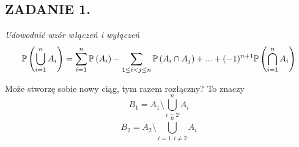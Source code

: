 \documentclass{article}
\begin{document}
\subsection*{ZADANIE 1.}
\emph{Udowodnić wzór włączeń i wyłączeń}
$$\mathbb{P}\left(\bigcup\limits_{i=1}^nA_i\right)=\sum\limits_{i=1}^n\mathbb{P}\left(A_i\right)-\sum\limits_{1\leq i<j\leq n}\mathbb{P}\left(A_i\cap A_j\right)+...+(-1)^{n+1}\mathbb{P}\left(\bigcap\limits_{i=1}^n A_i\right)$$

Może stworzę sobie nowy ciąg, tym razem rozłączny? To znaczy 
$$B_1=A_1\setminus\bigcup\limits_{i=2}^nA_i$$
$$B_2=A_2\setminus\bigcup\limits_{i=1,i\neq2}^nA_i$$
\end{document}
